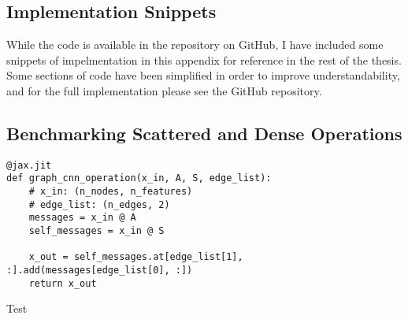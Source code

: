 \documentclass[../main.tex]{subfiles}
\begin{document}
\begin{appendices}
    \chapter{Implementation Snippets}\label{ch:implementation-snippets}
    While the code is available in the repository on GitHub, I have included some snippets of impelmentation in this appendix for reference in the rest of the thesis.
    Some sections of code have been simplified in order to improve understandability, and for the full implementation please see the GitHub repository.

    \section{Benchmarking Scattered and Dense Operations}\label{sec:benchmarking-scattered-and-dense-operations}
    \begin{listing}[!ht]
        \begin{verbatim}
@jax.jit
def graph_cnn_operation(x_in, A, S, edge_list):
    # x_in: (n_nodes, n_features)
    # edge_list: (n_edges, 2)
    messages = x_in @ A
    self_messages = x_in @ S

    x_out = self_messages.at[edge_list[1], :].add(messages[edge_list[0], :])
    return x_out
        \end{verbatim}
        \caption{Test}
        \label{lst:scatter}
    \end{listing}
\end{appendices}
\end{document}
